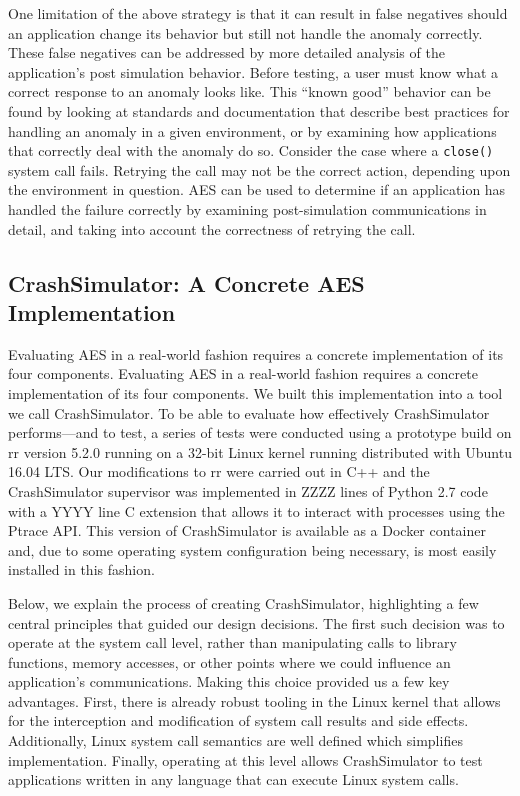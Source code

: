 One limitation of the above strategy
is that it can result in false negatives
should an application change its behavior
but still not handle the anomaly correctly.
These false negatives can be addressed
by more detailed analysis
of the application's post simulation behavior.
Before testing,
a user must know
what a correct response
to an anomaly looks like.
This ``known good'' behavior can be found
by looking at standards and documentation
that describe best practices for handling an anomaly
in a given environment,
or by examining how applications that correctly
deal with the anomaly do so.
Consider the case where a {\tt close()} system call fails.
Retrying the call may not be the correct action,
depending upon the environment in question.
AES can be used to determine if an application
has handled the failure correctly
by examining post-simulation communications in detail,
and taking into account the correctness of retrying the call.

\subsection{CrashSimulator: A Concrete AES Implementation}

Evaluating AES in a real-world fashion requires a concrete implementation
of its four components.  Evaluating AES in a real-world fashion requires a
concrete implementation of its four components. We built this
implementation into a tool we call CrashSimulator. To be able to evaluate
how effectively CrashSimulator performs—and to test, a series of tests were
conducted using a prototype build on rr version 5.2.0 running on a
32-bit Linux kernel running distributed with Ubuntu 16.04 LTS. Our
modifications to rr were carried out in C++ and the CrashSimulator
supervisor was implemented in ZZZZ lines of Python 2.7 code with a YYYY
line C extension that allows it to interact with processes using the Ptrace
API. This version of CrashSimulator is available as a Docker container and,
due to some operating system configuration being necessary, is most easily
installed in this fashion.

Below, we explain the process of creating CrashSimulator, highlighting a
few central principles that guided our design decisions. The first such
decision was to operate at the system call level, rather than manipulating
calls to library functions, memory accesses, or other points where we could
influence an application's communications. Making this choice provided us a
few key advantages. First, there is already robust tooling in the Linux
kernel that allows for the interception and modification of system call
results and side effects. Additionally, Linux system call semantics are
well defined which simplifies implementation. Finally, operating at this
level allows CrashSimulator to test applications written in any language
that can execute Linux system calls.

